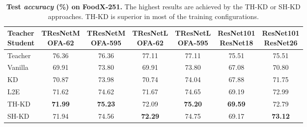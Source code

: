 \begin{table*}[t!]
\setlength{\tabcolsep}{3pt}
\begin{center}
\begin{tabular}{|l||c|c|c|c|c|c|}
\hline
\thead{Teacher \\Student} & \thead{TResNetM\\OFA-62} & \thead{TResNetM\\OFA-595} & \thead{TResNetL\\OFA-62} & \thead{TResNetL\\OFA-595} & \thead{ResNet101\\ResNet18} & \thead{ResNet101\\ResNet26} \\
\hline
Teacher & 76.36 & 76.36 & 77.11 & 77.11 & 75.51 & 75.51 \\
\hline
Vanilla & 69.91 & 73.80 & 69.91 & 73.80 & 67.08 & 70.80 \\
KD & 70.87 & 73.98 & 70.74 & 74.04 & 67.88 & 71.75 \\
L2E & 71.62 & 74.62 & 71.67 & 74.65 & 69.19 & 72.99 \\
TH-KD & \textbf{71.99} & \textbf{75.23} & 72.09 & \textbf{75.20} & \textbf{69.59} & 72.79 \\
SH-KD & 71.94 & 74.56 & \textbf{72.29} & 74.75 & 69.17 & \textbf{73.12} \\
\hline
\end{tabular}
\vspace{1pt}
\caption{\textbf{Test \emph{accuracy} (\%) on FoodX-251.} The highest results are achieved by the TH-KD or SH-KD approaches. TH-KD is superior in most of the training configurations.}
\label{tbl:foodx}
\end{center}
\vspace{-20pt}
\end{table*}








 


